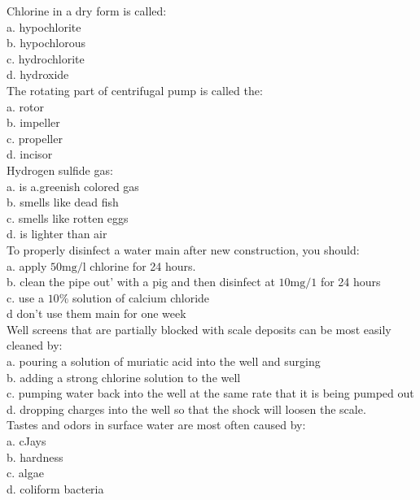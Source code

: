 Chlorine in a dry form is called:\\
a. hypochlorite\\
b. hypochlorous\\
c. hydrochlorite\\
d. hydroxide\\

The rotating part of centrifugal pump is called the:\\
a. rotor\\
b. impeller\\
c. propeller\\
d. incisor \\

Hydrogen sulfide gas:\\
a. is a.greenish colored gas\\
b. smells like dead fish\\
c. smells like rotten eggs\\
d. is lighter than air\\

To properly disinfect a water main after new construction, you should:\\
a. apply $50 \mathrm{mg} / \mathrm{l}$ chlorine for 24 hours.\\
b. clean the pipe out' with a pig and then disinfect at $10 \mathrm{mg} / 1$ for 24 hours\\
c. use a $10 \%$ solution of calcium chloride\\
d don't use them main for one week\\

Well screens that are partially blocked with scale deposits can be most easily cleaned by:\\
a. pouring a solution of muriatic acid into the well and surging\\
b. adding a strong chlorine solution to the well\\
c. pumping water back into the well at the same rate that it is being pumped out\\
d. dropping charges into the well so that the shock will loosen the scale.\\

Tastes and odors in surface water are most often caused by:\\
a. cJays\\
b. hardness\\
c. algae\\
d. coliform bacteria\\

